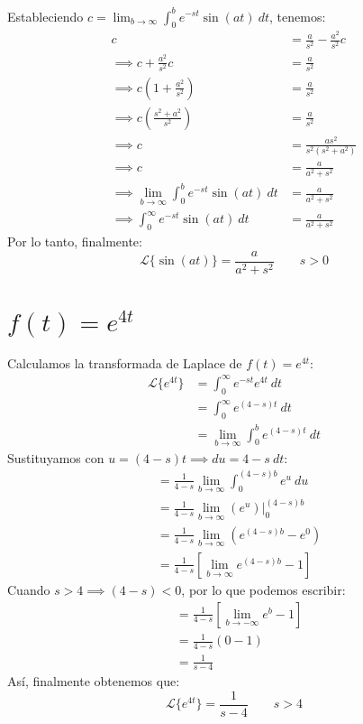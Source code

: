 \documentclass[12pt, a4paper]{article}
\begin{document}
Estableciendo \(c = \lim_{b \to \infty} \int_{0}^{b} e^{-st} \sin (at) \ dt\), tenemos:
\begin{align*}
	c &= \frac{a}{s ^{2}} - \frac{a ^{2}}{s ^{2}} c \\
	\implies c + \frac{a^{2}}{s ^{2}} c &= \frac{a}{s ^{2}} \\
	\implies c \left( 1 + \frac{a ^{2}}{s ^{2}} \right) &= \frac{a}{s ^{2}} \\
	\implies c \left( \frac{s ^{2} + a^{2}}{s ^{2}} \right) &= \frac{a}{s ^{2}} \\
	\implies c &= \frac{as ^{2}}{s ^{2}(s ^{2}+a^{2})} \\
	\implies c &= \frac{a}{a^{2} + s ^{2}} \\
	\implies \lim_{b \to \infty} \int_{0}^{b} e^{-st} \sin (at) \ dt &= \frac{a}{a ^{2} + s ^{2}} \\
	\implies \int_{0}^{\infty} e^{-st} \sin (at) \ dt &= \frac{a}{a^{2} + s ^{2}}
\end{align*}
Por lo tanto, finalmente:
\[
	\mathcal{L}\{\sin (at)\} = \frac{a}{a^{2} + s ^{2}} \qquad s > 0
\]

\setcounter{section}{10}
\section{\texorpdfstring{\(f(t)=e^{4t}\)}{f (t) = e (4t) }}

Calculamos la transformada de Laplace de \(f(t) = e^{4t}\):
\begin{align*}
	\mathcal{L}\{e^{4t}\} &= \int_{0}^{\infty} e^{-st} e^{4t}\ dt \\
	&= \int_{0}^{\infty} e^{(4-s)t} \ dt \\
	&= \lim_{b \to \infty} \int_{0}^{b} e^{(4-s)t} \ dt
\end{align*}
Sustituyamos con \(u = (4-s) t \implies du = 4-s\ dt\):
\begin{align*}
	&= \frac{1}{4-s} \lim_{b \to \infty} \int_{0}^{(4-s)b} e^{u} \ du \\
	&= \frac{1}{4-s} \lim_{b \to \infty} \left. \left( e^{u} \right)  \right|_{0}^{(4-s)b} \\
	&= \frac{1}{4-s} \lim_{b \to \infty} \left( e^{(4-s)b} - e^{0} \right) \\
	&= \frac{1}{4-s} \left[ \lim_{b \to \infty} e^{(4-s)b} - 1 \right]
\end{align*}
Cuando \(s > 4 \implies (4-s) < 0\), por lo que podemos escribir:
\begin{align*}
	&= \frac{1}{4-s} \left[ \lim_{b \to -\infty} e^{b} - 1 \right] \\
	&= \frac{1}{4-s} (0 - 1) \\
	&= \frac{1}{s-4}
\end{align*}
Así, finalmente obtenemos que:
\[
	\mathcal{L}\{e^{4t}\} = \frac{1}{s-4} \qquad s > 4
\]
\end{document}
